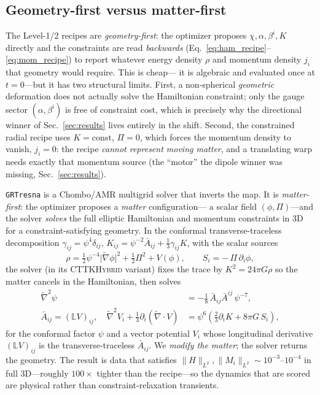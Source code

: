 \documentclass[twocolumn,floatfix,aps,prd,nofootinbib]{revtex4-2}
\begin{document}
\subsection{Geometry-first versus matter-first}
\label{sec:geom_vs_matter}

The Level-1/2 recipes are \emph{geometry-first}: the optimizer proposes
$\chi,\alpha,\beta^i,K$ directly and the constraints are read \emph{backwards}
(Eq.~\ref{eq:ham_recipe}--\ref{eq:mom_recipe}) to report whatever energy density
$\rho$ and momentum density $j_i$ that geometry would require.  This is cheap---
it is algebraic and evaluated once at $t=0$---but it has two structural limits.
First, a non-spherical \emph{geometric} deformation does not actually solve the
Hamiltonian constraint; only the gauge sector $(\alpha,\beta^i)$ is free of
constraint cost, which is precisely why the directional winner of
Sec.~\ref{sec:results} lives entirely in the shift.  Second, the constrained
radial recipe uses $K=\mathrm{const}$, $\Pi=0$, which forces the momentum
density to vanish, $j_i=0$: the recipe \emph{cannot represent moving matter},
and a translating warp needs exactly that momentum source (the ``motor'' the
dipole winner was missing, Sec.~\ref{sec:results}).

\texttt{GRTresna} is a Chombo/AMR multigrid solver that inverts the map.
It is \emph{matter-first}: the optimizer proposes a \emph{matter} configuration---
a scalar field $(\phi,\Pi)$---and the solver \emph{solves} the full elliptic
Hamiltonian and momentum constraints in 3D for a constraint-satisfying geometry.
In the conformal transverse-traceless decomposition $\gamma_{ij}=\psi^4\delta_{ij}$,
$K_{ij}=\psi^{-2}\bar A_{ij}+\tfrac13\gamma_{ij}K$, with the scalar sources
\begin{equation}
\rho=\tfrac12\psi^{-4}\lvert\tilde\nabla\phi\rvert^2+\tfrac12\Pi^2+V(\phi),
\qquad
S_i=-\,\Pi\,\partial_i\phi,
\label{eq:scalar_sources}
\end{equation}
the solver (in its \textsc{CTTKHybrid} variant) fixes the trace by
$K^2=24\pi G\rho$ so the matter cancels in the Hamiltonian, then solves
\begin{align}
\tilde\nabla^2\psi &= -\tfrac18\,\bar A_{ij}\bar A^{ij}\,\psi^{-7},
\label{eq:lichnerowicz}\\
\bar A_{ij}=(\mathbb{L}V)_{ij},\quad
\tilde\nabla^2 V_i+\tfrac13\partial_i(\tilde\nabla\!\cdot\!V)
&=\psi^6\!\left(\tfrac23\partial_i K+8\pi G\,S_i\right),
\label{eq:momentum_solve}
\end{align}
for the conformal factor $\psi$ and a vector potential $V_i$ whose longitudinal
derivative $(\mathbb{L}V)_{ij}$ is the transverse-traceless $\bar A_{ij}$.  We
\emph{modify the matter}; the solver returns the geometry.  The result is data
that satisfies $\lVert H\rVert_{L^2},\lVert M_i\rVert_{L^2}\sim10^{-3}$--$10^{-4}$
in full 3D---roughly $100\times$ tighter than the recipe---so the dynamics that
are scored are physical rather than constraint-relaxation transients.
\end{document}
